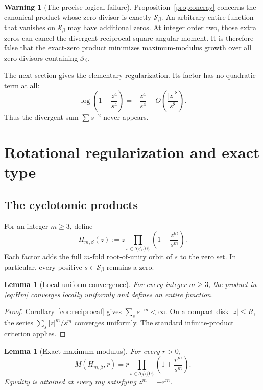 \documentclass[11pt,oneside]{article}
\newtheorem{lemma}[theorem]{Lemma}
\theoremstyle{definition}
\newtheorem{warning}[theorem]{Warning}
\theoremstyle{remark}
\newcommand{\Sbeta}{\mathcal S_\beta}
\begin{document}
\begin{warning}[The precise logical failure]
Proposition~\ref{prop:oneray} concerns the canonical product whose zero divisor is exactly
$\Sbeta$.  An arbitrary entire function that vanishes on $\Sbeta$ may have additional
zeros.  At integer order two, those extra zeros can cancel the divergent reciprocal-square
angular moment.  It is therefore false that the exact-zero product minimizes maximum-modulus
growth over all zero divisors containing $\Sbeta$.
\end{warning}

The next section gives the elementary regularization.  Its factor has no quadratic term at
all:
\[
 \log\left(1-\frac{z^4}{s^4}\right)
 =-\frac{z^4}{s^4}+O\left(\frac{|z|^8}{s^8}\right).
\]
Thus the divergent sum $\sum s^{-2}$ never appears.

\section{Rotational regularization and exact type}
\label{sec:rotprod}

\subsection{The cyclotomic products}

For an integer $m\ge3$, define
\begin{equation}
 H_{m,\beta}(z)
 :=z\prod_{s\in\Sbeta\setminus\{0\}}
          \left(1-\frac{z^m}{s^m}\right).
 \label{eq:Hm}
\end{equation}
Each factor adds the full $m$-fold root-of-unity orbit of $s$ to the zero set.  In
particular, every positive $s\in\Sbeta$ remains a zero.

\begin{lemma}[Local uniform convergence]
\label{lem:convergence}
For every integer $m\ge3$, the product in \eqref{eq:Hm} converges locally uniformly and
defines an entire function.
\end{lemma}

\begin{proof}
Corollary~\ref{cor:reciprocal} gives $\sum_s s^{-m}<\infty$.  On a compact disk
$|z|\le R$, the series $\sum_s|z|^m/s^m$ converges uniformly.  The standard infinite-product
criterion applies.
\end{proof}

\begin{lemma}[Exact maximum modulus]
\label{lem:maxmod}
For every $r>0$,
\[
 M(H_{m,\beta},r)
 =r\prod_{s\in\Sbeta\setminus\{0\}}
       \left(1+\frac{r^m}{s^m}\right).
\]
Equality is attained at every ray satisfying $z^m=-r^m$.
\end{lemma}
\end{document}
